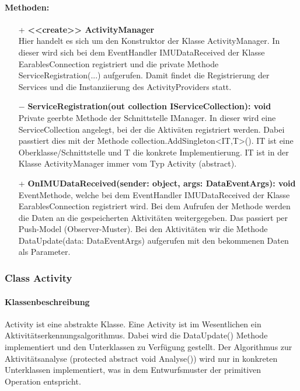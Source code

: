 \documentclass[a4paper,12pt]{article}
\begin{document}
	\paragraph{Methoden:}
	\begin{itemize}
		\item[+] \textbf{<<create>> ActivityManager}\\Hier handelt es sich um den Konstruktor der Klasse ActivityManager. In dieser wird sich bei dem EventHandler IMUDataReceived der Klasse EarablesConnection registriert und die private Methode ServiceRegistration(...) aufgerufen. Damit findet die Registrierung der Services und die Instanziierung des ActivityProviders statt.
		\item[$-$] \textbf{ServiceRegistration(out collection IServiceCollection): void}\\Private geerbte Methode der Schnittstelle IManager. In dieser wird eine ServiceCollection angelegt, bei der die Aktiväten registriert werden. Dabei passtiert dies mit der Methode collection.AddSingleton<IT,T>(). IT ist eine Oberklasse/Schnittstelle und T die konkrete Implementierung. IT ist in der Klasse ActivityManager immer vom Typ Activity (abstract).
		\item[+] \textbf{OnIMUDataReceived(sender: object, args: DataEventArgs): void}\\EventMethode, welche bei dem EventHandler IMUDataReceived der Klasse EarablesConnection registriert wird. Bei dem Aufrufen der Methode werden die Daten an die gespeicherten Aktivitäten weitergegeben. Das passiert per Push-Model (Observer-Muster). Bei den Aktivitäten wir die Methode DataUpdate(data: DataEventArgs) aufgerufen mit den bekommenen Daten als Parameter.
	\end{itemize}
	
	
	\subsubsection{Class Activity}
	\paragraph{Klassenbeschreibung}
	Activity ist eine abstrakte Klasse. Eine Activity ist im Wesentlichen ein Aktivitätserkennungsalgorithmus. Dabei wird die DataUpdate() Methode implementiert und den Unterklassen zu Verfügung gestellt. Der Algorithmus zur Aktivitätsanalyse (protected abstract void Analyse()) wird nur in konkreten Unterklassen implementiert, was in dem Entwurfsmuster der primitiven Operation entspricht.
	
\end{document}
